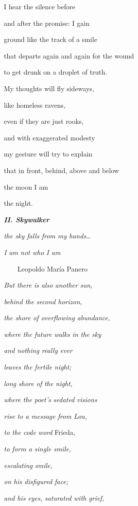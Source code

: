 \bigskip

I hear the silence before

and after the promise: I gain 

ground like the track of a smile

that departs again and again for the wound

to get drunk on a droplet of truth.


\bigskip

My thoughts will fly sideways, 

like homeless ravens,

even if they are just rooks,

and with exaggerated modesty

my gesture will try to explain

that in front, behind, above and below

the moon I am

the night.


\bigskip


\bigskip

{\bfseries\itshape
II. Skywalker}


\bigskip

\emph{
the sky falls from my hands…}

\emph{
I am not who I am}

\ \ \ \  Leopoldo María Panero


\bigskip


\bigskip

\emph{
But there is also another sun,}

\emph{
behind the second horizon,}

\emph{
the shore of overflowing abundance, }

\emph{
where the future walks in the sky}

\emph{
and nothing really ever}

\emph{
leaves the fertile night;}

\emph{
long shore of the night,}

\emph{
where the poet's sedated visions }

\emph{
rise to a message from Lou,}

\emph{to the code word }Frieda, 

\emph{
to form a single smile,}

\emph{
escalating smile,}

\emph{
on his disfigured face;}

\emph{
and his eyes, saturated with grief,}

